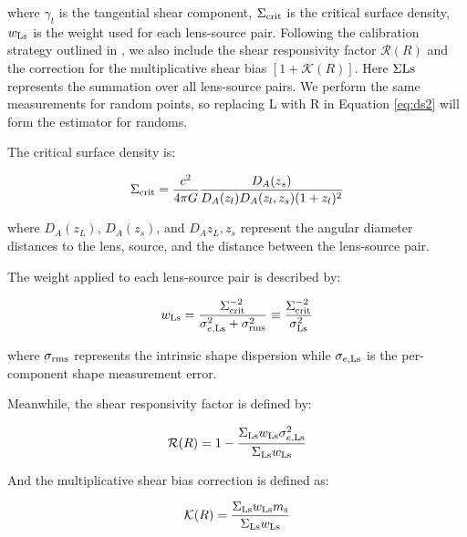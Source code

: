 \documentclass[fleqn,usenatbib,useAMS]{mnras}
\begin{document}
    \noindent where $\gamma_{t}$ is the tangential shear component, $\Sigma_{\rm crit}$ is the
    critical surface density, $w_{\rm Ls}$ is the weight used for each lens-source pair.
    Following the calibration strategy outlined in \citet{HSC-WLCALIB}, we also include
    the shear responsivity factor $\mathcal{R}(R)$ and the correction for the multiplicative
    shear bias $[1+\mathcal{K}(R)]$.
    Here $\Sigma{\rm Ls}$ represents the summation over all lens-source pairs.
    We perform the same measurements for random points, so replacing L with R in
    Equation \ref{eq:ds2} will form the estimator for randoms.

    The critical surface density is:

    \begin{equation}
        \Sigma_{\rm crit}=\frac{c^2}{4\pi G} \frac{D_A(z_s)}{D_A(z_l) D_A(z_l, z_s) (1+z_l)^2}
        \label{eq:sigcrit}
    \end{equation}

    \noindent where $D_A(z_L)$, $D_A(z_s)$, and $D_A{z_L, z_s}$ represent the angular diameter
    distances to the lens, source, and the distance between the lens-source pair.

    The weight applied to each lens-source pair is described by:

    \begin{equation}
        w_{\rm Ls} = \frac{\Sigma_{\rm crit}^{-2}}{\sigma^2_{e, {\rm Ls}} + \sigma^2_{\rm rms}}
            \equiv \frac{\Sigma_{\rm crit}^{-2}}{\sigma^2_{{\rm Ls}}}
        \label{eq:weight}
    \end{equation}

    \noindent where $\sigma_{\rm rms}$ represents the intrinsic shape dispersion while
    $\sigma_{e, \rm Ls}$ is the per-component shape measurement error.

    Meanwhile, the shear responsivity factor is defined by:

    \begin{equation}
        \mathcal{R}(R) = 1 - \frac{\Sigma_{\rm Ls} w_{\rm Ls} \sigma^2_{e, {\rm Ls}}}{\Sigma_{\rm Ls} w_{\rm Ls}}
        \label{eq:rfactor}
    \end{equation}

    \noindent And the multiplicative shear bias correction is defined as:

    \begin{equation}
        \mathcal{K}(R) = \frac{\Sigma_{\rm Ls} w_{\rm Ls} m_{\rm s}}{\Sigma_{\rm Ls} w_{\rm Ls}}
        \label{eq:kfactor}
    \end{equation}
\end{document}
